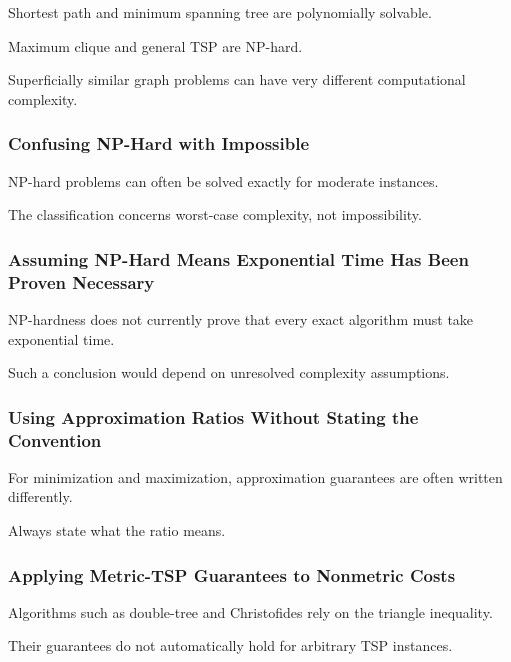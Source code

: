 Shortest path and minimum spanning tree are polynomially solvable.

Maximum clique and general TSP are NP-hard.

Superficially similar graph problems can have very different
computational complexity.

\subsubsection{Confusing NP-Hard with Impossible}

NP-hard problems can often be solved exactly for moderate instances.

The classification concerns worst-case complexity, not impossibility.

\subsubsection{Assuming NP-Hard Means Exponential Time Has Been Proven Necessary}

NP-hardness does not currently prove that every exact algorithm must take
exponential time.

Such a conclusion would depend on unresolved complexity assumptions.

\subsubsection{Using Approximation Ratios Without Stating the Convention}

For minimization and maximization, approximation guarantees are often
written differently.

Always state what the ratio means.

\subsubsection{Applying Metric-TSP Guarantees to Nonmetric Costs}

Algorithms such as double-tree and Christofides rely on the triangle
inequality.

Their guarantees do not automatically hold for arbitrary TSP instances.

